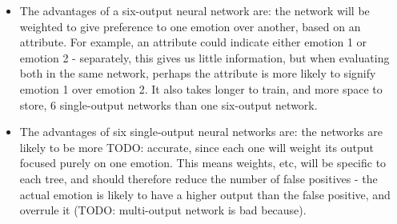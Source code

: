 \documentclass[12pt]{article}
\begin{document}
\begin{itemize}
  \item The advantages of a six-output neural network are: the network will be weighted to give preference to one emotion over another, based on an attribute. For example, an attribute could indicate either emotion 1 or emotion 2 - separately, this gives us little information, but when evaluating both in the same network, perhaps the attribute is more likely to signify emotion 1 over emotion 2. It also takes longer to train, and more space to store,  6 single-output networks than one six-output network.
  \item The advantages of six single-output neural networks are: the networks are likely to be more TODO: accurate, since each one will weight its output focused purely on one emotion. This means weights, etc, will be specific to each tree, and should therefore reduce the number of false positives - the actual emotion is likely to have a higher output than the false positive, and overrule it (TODO: multi-output network is bad because).
\end{itemize}
\end{document}
